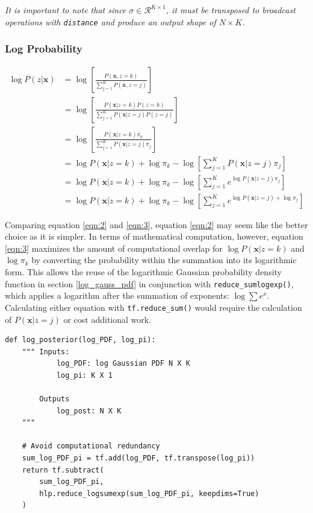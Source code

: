 \documentclass[letterpaper]{article}
\begin{document}
\noindent
\textit{It is important to note that since $\sigma \in \mathcal{R}^{K \times 1}$, it must be transposed to broadcast operations with \texttt{distance} and produce an output shape of $N \times K$.}

\newpage

\subsubsection{Log Probability}

\begin{align*}
\log P(z | \textbf{x}) &= \log \left[ \frac{P(\textbf{x}, z = k)}{\sum_{j = 1}^{K} P(\textbf{x}, z = j)} \right] \\
&= 
\log \left[ \frac{P(\textbf{x} | z = k) P(z = k)}{\sum_{j = 1}^{K} P(\textbf{x} | z = j) P(z = j)} \right] \\
&=
\log \left[ \frac{P(\textbf{x} | z = k) \pi_k}{\sum_{j = 1}^{K} P(\textbf{x} | z = j) \pi_j} \right] \\
&= \label{eqn:2} \tag{2}
\log P(\textbf{x} | z = k) + \log \pi_k - \log \left[ \sum_{j = 1}^{K} P(\textbf{x} | z = j) \pi_j \right] \\
&= 
\log P(\textbf{x} | z = k) + \log \pi_k - \log \left[ \sum_{j = 1}^{K} e^{\log P(\textbf{x} | z = j) \pi_j} \right] \\
&= \label{eqn:3} \tag{3}
\log P(\textbf{x} | z = k) + \log \pi_k - \log \left[ \sum_{j = 1}^{K} e^{\log P(\textbf{x} | z = j) + \log \pi_j} \right]
\end{align*}

\noindent
Comparing equation \ref{eqn:2} and \ref{eqn:3}, equation \ref{eqn:2} may seem like the better choice as it is simpler. In terms of mathematical computation, however, equation \ref{eqn:3} maximizes the amount of computational overlap for $\log P(\textbf{x} | z = k)$ and $\log \pi_k$ by converting the probability within the summation into its logarithmic form. This allows the reuse of the logarithmic Gaussian probability density function in section \ref{log_gauss_pdf} in conjunction with \texttt{reduce\_sumlogexp()}, which applies a logarithm after the summation of exponents: $\log \sum e^{x}$. Calculating either equation with \texttt{tf.reduce\_sum()} would require the calculation of $P(\textbf{x} | z = j)$ or cost additional work. 

\begin{lstlisting}
def log_posterior(log_PDF, log_pi):
    """ Inputs:
            log_PDF: log Gaussian PDF N X K
            log_pi: K X 1

        Outputs
            log_post: N X K
    """
    
    # Avoid computational redundancy
    sum_log_PDF_pi = tf.add(log_PDF, tf.transpose(log_pi))
    return tf.subtract(
        sum_log_PDF_pi,
        hlp.reduce_logsumexp(sum_log_PDF_pi, keepdims=True)
    )
\end{lstlisting}
\end{document}
